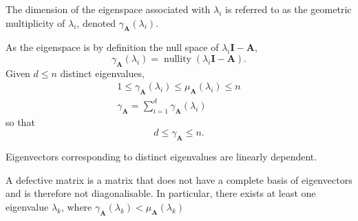 \documentclass{article}
\DeclareMathOperator*{\nullity}{nullity}
\begin{document}
\begin{definition}
    The dimension of the eigenspace associated with \(\lambda_i\) is referred to as the
    geometric multiplicity of \(\lambda_i\), denoted \(\gamma_{\symbf{A}}\left( \lambda_i \right)\).

    As the eigenspace is by definition the
    null space of \(\lambda_i \symbf{I} - \symbf{A}\),
    \begin{equation*}
        \gamma_{\symbf{A}} \left( \lambda_i \right) = \nullity{\left( \lambda_i \symbf{I} - \symbf{A} \right)}.
    \end{equation*}
    Given \(d \leq n\) distinct eigenvalues,
    \begin{gather*}
        1 \leq \gamma_{\symbf{A}}\left( \lambda_i \right) \leq \mu_{\symbf{A}}\left( \lambda_i \right) \leq n \\
        \gamma_{\symbf{A}} = \sum_{i = 1}^d \gamma_{\symbf{A}} \left( \lambda_i \right)
    \end{gather*}
    so that
    \begin{equation*}
        d \leq \gamma_{\symbf{A}} \leq n.
    \end{equation*}
\end{definition}
\begin{theorem}
    Eigenvectors corresponding to distinct eigenvalues are linearly dependent.
\end{theorem}
\begin{definition}
    A defective matrix is a matrix that does not have a complete basis of eigenvectors and is therefore not diagonalisable.
    In particular, there exists at least one eigenvalue \(\lambda_k\),
    where \(\gamma_{\symbf{A}}\left( \lambda_k \right) < \mu_{\symbf{A}}\left( \lambda_k \right)\)
\end{definition}
\end{document}
